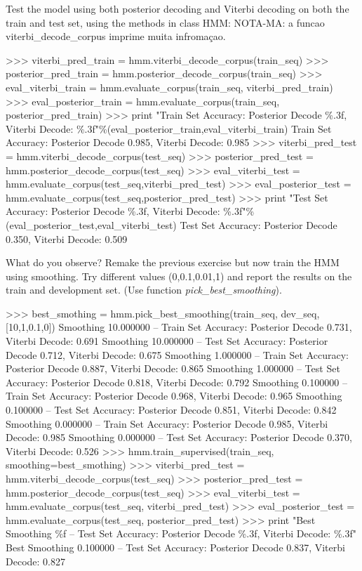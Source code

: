 \begin{exercise}
Test the model using both posterior decoding and Viterbi decoding on
both the train and test set, using the methods in class HMM:
NOTA-MA: a funcao viterbi_decode_corpus imprime muita infromaçao.
\begin{python}
>>> viterbi_pred_train = hmm.viterbi_decode_corpus(train_seq)
>>> posterior_pred_train = hmm.posterior_decode_corpus(train_seq)
>>> eval_viterbi_train =   hmm.evaluate_corpus(train_seq, viterbi_pred_train)
>>> eval_posterior_train =  hmm.evaluate_corpus(train_seq, posterior_pred_train)
>>> print "Train Set Accuracy: Posterior Decode \%.3f, Viterbi Decode: \%.3f"\%(eval_posterior_train,eval_viterbi_train)
Train Set Accuracy: Posterior Decode 0.985, Viterbi Decode: 0.985
>>> viterbi_pred_test = hmm.viterbi_decode_corpus(test_seq)
>>> posterior_pred_test = hmm.posterior_decode_corpus(test_seq)
>>> eval_viterbi_test =   hmm.evaluate_corpus(test_seq,viterbi_pred_test)
>>> eval_posterior_test = hmm.evaluate_corpus(test_seq,posterior_pred_test)
>>> print "Test Set Accuracy: Posterior Decode \%.3f, Viterbi Decode: \%.3f"\%(eval_posterior_test,eval_viterbi_test)
Test Set Accuracy: Posterior Decode 0.350, Viterbi Decode: 0.509
\end{python}

What do you observe? Remake the previous exercise but now train the HMM
using smoothing. Try different values (0,0.1,0.01,1) and report the results on the
train and development set. (Use function
\emph{pick\_best\_smoothing}).


\begin{python}
>>> best_smothing = hmm.pick_best_smoothing(train_seq, dev_seq, [10,1,0.1,0])
Smoothing 10.000000 --  Train Set Accuracy: Posterior Decode 0.731, Viterbi Decode: 0.691
Smoothing 10.000000 -- Test Set Accuracy: Posterior Decode 0.712, Viterbi Decode: 0.675
Smoothing 1.000000 --  Train Set Accuracy: Posterior Decode 0.887, Viterbi Decode: 0.865
Smoothing 1.000000 -- Test Set Accuracy: Posterior Decode 0.818, Viterbi Decode: 0.792
Smoothing 0.100000 --  Train Set Accuracy: Posterior Decode 0.968, Viterbi Decode: 0.965
Smoothing 0.100000 -- Test Set Accuracy: Posterior Decode 0.851, Viterbi Decode: 0.842
Smoothing 0.000000 --  Train Set Accuracy: Posterior Decode 0.985, Viterbi Decode: 0.985
Smoothing 0.000000 -- Test Set Accuracy: Posterior Decode 0.370, Viterbi Decode: 0.526
>>> hmm.train_supervised(train_seq, smoothing=best_smothing)
>>> viterbi_pred_test = hmm.viterbi_decode_corpus(test_seq)
>>> posterior_pred_test = hmm.posterior_decode_corpus(test_seq)
>>> eval_viterbi_test =   hmm.evaluate_corpus(test_seq, viterbi_pred_test)
>>> eval_posterior_test = hmm.evaluate_corpus(test_seq, posterior_pred_test)
>>> print "Best Smoothing \%f --  Test Set Accuracy: Posterior Decode \%.3f, Viterbi Decode: \%.3f"%
Best Smoothing 0.100000 --  Test Set Accuracy: Posterior Decode 0.837, Viterbi Decode: 0.827
\end{python}



\end{exercise}
